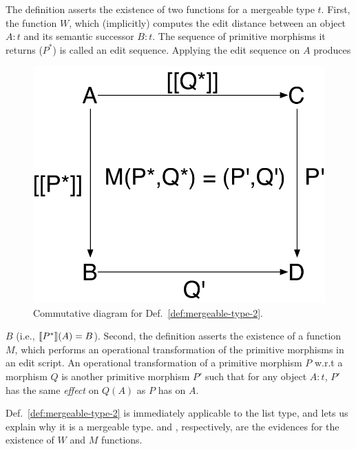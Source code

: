 The definition asserts the existence of two functions for a mergeable
type $t$. First, the function $W$, which (implicitly) computes the
edit distance between an object $A:t$ and its semantic successor
$B:t$.  The sequence of primitive morphisms it returns ($P^*$) is
called an edit sequence. Applying the edit sequence on $A$ produces
\begin{figure}
\centering
\includegraphics[scale=0.35]{Figures/pushouts-2}
\caption{Commutative diagram for Def.~\ref{def:mergeable-type-2}.}
\label{fig:pushouts-2}
\end{figure}
$B$ (i.e., $\llbracket P^* \rrbracket(A) = B$). Second, the definition asserts the
existence of a function $M$, which performs an operational
transformation of the primitive morphisms in an edit script. An
operational transformation of a primitive morphism $P$ w.r.t a
morphism $Q$ is another primitive morphism $P'$ such that for any
object $A:t$, $P'$ has the same \emph{effect} on $Q(A)$ as $P$ has on
$A$.

Def.~\ref{def:mergeable-type-2} is immediately applicable to the list
type, and lets us explain why it is a mergeable type.  
and , respectively, are the evidences for the
existence of $W$ and $M$ functions.


